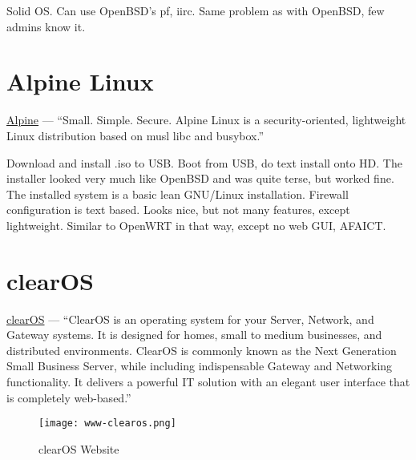Solid OS. Can use OpenBSD's pf, iirc. Same problem as with OpenBSD, few admins know it.


\section{Alpine Linux}
 \href{https://www.alpinelinux.org/}{Alpine} --- ``Small. Simple. Secure. Alpine Linux is a security-oriented, lightweight Linux distribution based on musl libc and busybox.''

Download and install .iso to USB. Boot from USB, do text install onto HD. The installer looked very much like OpenBSD and was quite terse, but worked fine.
The installed system is a basic lean GNU/Linux installation. Firewall configuration is text based. Looks nice, but not many features, except lightweight.
Similar to OpenWRT in that way, except no web GUI, AFAICT.


\section{clearOS}

\href{https://www.clearos.com/}{clearOS} --- ``ClearOS is an operating system for your Server, Network, and Gateway systems. It is designed for homes, small to medium businesses, and distributed environments. ClearOS is commonly known as the Next Generation Small Business Server, while including indispensable Gateway and Networking functionality. It delivers a powerful IT solution with an elegant user interface that is completely web-based.''

\begin{figure}[h!]
\texttt{[image: www-clearos.png]}
 \caption{clearOS Website}
 \label{fig:www-clearos}
\end{figure}

